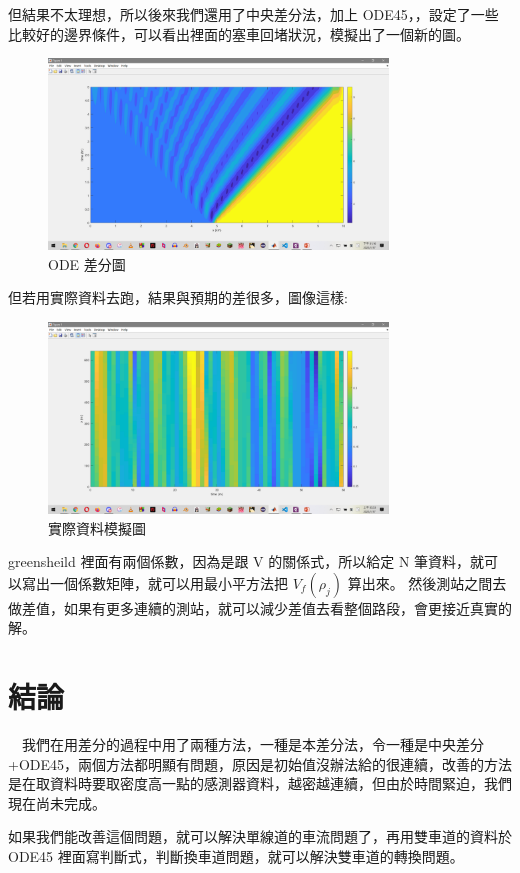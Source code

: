 \documentclass[a4paper, 11pt]{report}
\begin{document}
但結果不太理想，所以後來我們還用了中央差分法，加上 ODE45，，設定了一些比較好的邊界條件，可以看出裡面的塞車回堵狀況，模擬出了一個新的圖。

\begin{figure}[htbp]
\centerline{\includegraphics[height=2in]{output1.png}}
\caption{ODE 差分圖}
\label{program_flowchart}
\end{figure}

\newpage

但若用實際資料去跑，結果與預期的差很多，圖像這樣:
\begin{figure}[htbp]
\centerline{\includegraphics[height=2in]{real.png}}
\caption{實際資料模擬圖}
\label{program_flowchart}
\end{figure}

greensheild 裡面有兩個係數，因為是跟 V 的關係式，所以給定 N 筆資料，就可以寫出一個係數矩陣，就可以用最小平方法把 $V_f(\rho_j)$ 算出來。 然後測站之間去做差值，如果有更多連續的測站，就可以減少差值去看整個路段，會更接近真實的解。

\section{結論}

$\quad$我們在用差分的過程中用了兩種方法，一種是本差分法，令一種是中央差分+ODE45，兩個方法都明顯有問題，原因是初始值沒辦法給的很連續，改善的方法是在取資料時要取密度高一點的感測器資料，越密越連續，但由於時間緊迫，我們現在尚未完成。

如果我們能改善這個問題，就可以解決單線道的車流問題了，再用雙車道的資料於 ODE45 裡面寫判斷式，判斷換車道問題，就可以解決雙車道的轉換問題。

\renewcommand{\bibname}{References}


\end{document}
